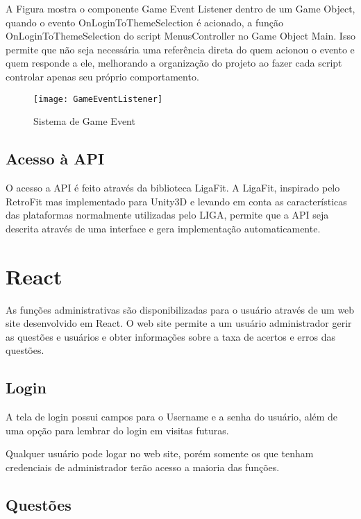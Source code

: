 A Figura  mostra o componente Game Event Listener dentro de um Game Object, quando o evento OnLoginToThemeSelection é acionado, a função OnLoginToThemeSelection do script MenusController no Game Object Main. Isso permite que não seja necessária uma referência direta do quem acionou o evento e quem responde a ele, melhorando a organização do projeto ao fazer cada script controlar apenas seu próprio comportamento.

\begin{figure}[htb]
\caption{\label{fig:estrutura} Sistema de Game Event }
\begin{center}
\texttt{[image: GameEventListener]}
\end{center}
\end{figure}

\subsection{Acesso à API}
\label{subsec:acessoapi}

O acesso a API é feito através da biblioteca LigaFit. A LigaFit, inspirado pelo RetroFit mas implementado para Unity3D e levando em conta as características das plataformas normalmente utilizadas pelo LIGA, permite que a API seja descrita através de uma interface e gera implementação automaticamente.


\section{React}
\label{sec:react}
As funções administrativas são disponibilizadas para o usuário através de um web site desenvolvido em React\cite{react}. O web site permite a um usuário administrador gerir as questões e usuários e obter informações sobre a taxa de acertos e erros das questões. 

\subsection{Login}
\label{subsec:loginreact}

A tela de login possui campos para o Username e a senha do usuário, além de uma opção para lembrar do login em visitas futuras.

Qualquer usuário pode logar no web site, porém somente os que tenham credenciais de administrador terão acesso a maioria das funções.


\subsection{Questões}
\label{subsec:questoesreact}

